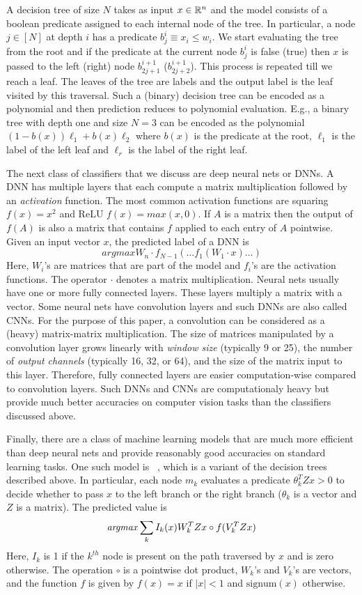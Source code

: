 A decision tree of size $N$ takes as input $x\in{\mathbb{R}}^n$ and the model consists of a boolean predicate
assigned to each internal node of the tree. In particular, a node $j\in[N]$ at depth $i$ has a predicate $b_{j}^i\equiv x_i\leq w_i$. We start evaluating the tree from the root and if the predicate at the current node $b_j^i$ is false (true) then $x$ is passed to the left (right) node $b_{2j+1}^{i+1}$ ($b_{2j+2}^{i+1}$). This process is repeated till we reach a leaf. The leaves of the tree are labels and the output label is the leaf visited by this traversal.
Such a (binary) decision tree can be encoded as a polynomial and then prediction
reduces to polynomial evaluation. E.g., a binary tree with depth one and size $N=3$ can be encoded as the polynomial
$(1-b(x))\ell_1 + b(x)\ell_2$ where $b(x)$ is the predicate at the root, $\ell_1$ is the label of the left leaf and $\ell_r$ is the label of the right leaf.

The next class of classifiers that we discuss are deep neural nets or DNNs. 
A DNN has multiple layers that each compute a matrix multiplication followed by
an {\it activation} function. The most common activation functions are 
squaring $f(x)=x^2$ and ReLU $f(x)=\mathit{max}(x,0)$. 
If $A$ is a matrix then the output of $f(A)$ is also a matrix that contains $f$  applied
 to each entry of $A$ pointwise.
Given an input vector $x$, the predicted label of a DNN is
\[
 \mathit{argmax} W_n\cdot f_{N-1}(\ldots f_1(W_1\cdot x)\ldots)
\]
Here, $W_i$'s are matrices that are part of the model and $f_i$'s are the activation functions.
The operator $\cdot$ denotes a matrix multiplication.
Neural nets usually have one or more fully connected layers.
These layers multiply a matrix with a vector.
Some neural nets have convolution layers and such DNNs are also called CNNs.
For the purpose of this paper, a convolution can be considered as a (heavy) matrix-matrix multiplication. The size of matrices manipulated by a convolution layer grows linearly with {\it window size} (typically 9 or 25), the number of {\it output channels} (typically 16, 32, or 64),
and the size of the matrix input to this layer. 
Therefore, fully connected layers are easier computation-wise compared
to convolution layers. Such DNNs and CNNs are computationaly heavy but provide
much better accuracies on computer vision tasks than the classifiers discussed above. 

Finally, there are a class of machine learning models that are much more efficient than
deep neural nets and provide reasonably good accuracies on standard learning tasks. One such model
is \bonsai~\cite{bonsai}, which is a variant of the decision trees described above.
In particular, each node $m_k$ evaluates a predicate $\theta_k^TZx > 0$ to decide whether
to pass $x$ to the left branch or the right branch ($\theta_k$ is a vector and $Z$ is a matrix).
The predicted value is
\[
{\it argmax} \sum_k I_k(x)W_k^TZx\circ f(V_k^TZx) 
\]
Here, $I_k$ is 1 if the $k^{th}$ node is present on the path traversed by $x$
and is zero otherwise. 
The operation $\circ$ is a pointwise dot product, $W_k$'s and $V_k$'s are vectors,  and
the function $f$ is given by $f(x) = x$ if $|x| < 1$ and $\mathrm{signum}(x)$ otherwise.


